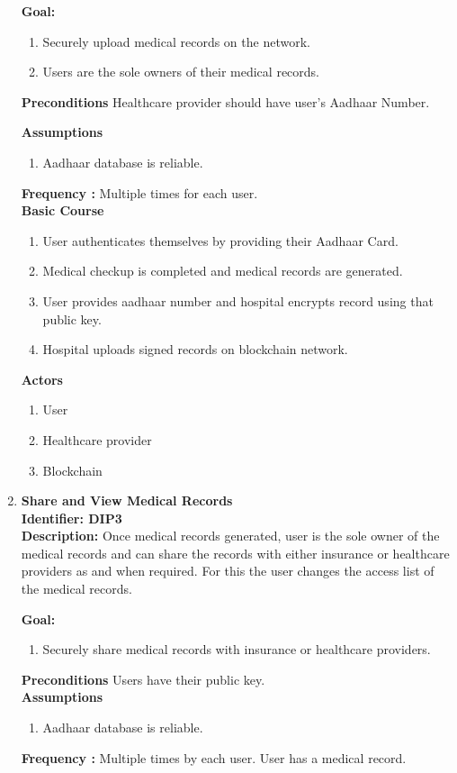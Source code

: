 \begin{enumerate}
	      \textbf{Goal:}
	      \begin{enumerate}
	      	\item  Securely upload medical records on the network.
	      	\item  Users are the sole owners of their medical records.
	      \end{enumerate}
	      \textbf{Preconditions} Healthcare provider should have user’s Aadhaar Number.
	      	      
	      \textbf{Assumptions}
	      \begin{enumerate}
	      	\item Aadhaar database is reliable.
	      \end{enumerate}
	      \textbf{Frequency :} Multiple times for each user.\\
	      \textbf{Basic Course}
	      \begin{enumerate}
	      	\item	User authenticates themselves by providing their Aadhaar Card.
	      	\item	Medical checkup is completed and medical records are generated.
	      	\item	User provides aadhaar number and hospital encrypts record using that public key.
	      	\item 	Hospital uploads signed records on blockchain network.
	      	      	      	      
	      \end{enumerate}
	      \textbf{Actors}
	      \begin{enumerate}
	      	\item  User
	      	\item Healthcare provider
	      	\item Blockchain
	      \end{enumerate}
	      	         
	\item \textbf{Share and View Medical Records} \\
	      \textbf{ Identifier: DIP3} \\
	      \textbf{ Description:} Once medical records generated, user is the sole owner of the medical records and can share the records with either insurance or healthcare providers as and when required. For this the user changes the access list of the medical records.
	      	      
	      \textbf{Goal:}
	      \begin{enumerate}
	      	\item  Securely share medical records with insurance or healthcare providers.
	      \end{enumerate}
	      \textbf{Preconditions} Users have their public key.\\
	      \textbf{Assumptions}
	      \begin{enumerate}
	      	\item Aadhaar database is reliable.
	      \end{enumerate}
	      \textbf{Frequency :} Multiple times by each user.
	      User has a medical record.
	      	                  

\end{enumerate}
